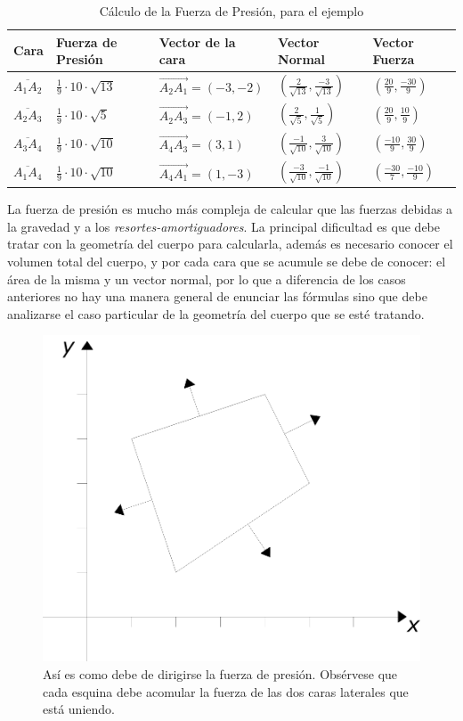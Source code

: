 \begin{table}
\begin{center}
\begin{tabular} {@{}lllll@{}}
\toprule
Cara & Fuerza de Presión &  Vector de la cara & Vector Normal & Vector Fuerza \\ \midrule
$\overline{A_1A_2}$ & $\frac{1}{9} \cdot 10 \cdot \sqrt{13} $ & $\overrightarrow{A_2A_1} = (-3,-2)$ & $(\frac{2}{\sqrt{13}}, \frac{-3}{\sqrt{13}})$ & $(\frac{20}{9}, \frac{-30}{9})$ \\
$\overline{A_2A_3}$ & $\frac{1}{9} \cdot 10 \cdot \sqrt{5} $ & $\overrightarrow{A_2A_3} = (-1,2)$ & $(\frac{2}{\sqrt{5}}, \frac{1}{\sqrt{5}})$ & $(\frac{20}{9}, \frac{10}{9})$ \\
$\overline{A_3A_4}$ & $\frac{1}{9} \cdot 10 \cdot \sqrt{10} $ & $\overrightarrow{A_4A_3} = (3,1)$ & $(\frac{-1}{\sqrt{10}}, \frac{3}{\sqrt{10}})$ & $(\frac{-10}{9}, \frac{30}{9})$ \\
$\overline{A_1A_4}$ & $\frac{1}{9} \cdot 10 \cdot \sqrt{10} $ & $\overrightarrow{A_4A_1} = (1,-3)$ & $(\frac{-3}{\sqrt{10}}, \frac{-1}{\sqrt{10}})$ & $(\frac{-30}{7}, \frac{-10}{9})$ \\ 
\bottomrule
\end{tabular}
\end{center}
\caption[Ejemplo sobre cómo calcular la fuerza de presión]{Cálculo de la Fuerza de Presión, para el ejemplo}
\label{ejemplo:presion}
\end{table}

La fuerza de presión es mucho más compleja de calcular que las fuerzas debidas a la gravedad y a los \emph{resortes-amortiguadores}.
La principal dificultad es que debe tratar con la geometría del cuerpo para calcularla, además es necesario conocer el volumen total del cuerpo, y por cada cara que se acumule se debe de conocer: el área de la misma y un vector normal, por lo que a diferencia de los casos anteriores no hay una manera general de enunciar las fórmulas sino que debe analizarse el caso particular de la geometría del cuerpo que se esté tratando.


\begin{figure}
 \centering
 \includegraphics[]{Img/presion_bien}
 \caption[Vectores de presión correctos]{ 
 Así es como debe de dirigirse la fuerza de presión. Obsérvese que cada esquina debe acomular la fuerza de las dos caras laterales que está uniendo.
 } \label{presionBien:fig}
\end{figure}
